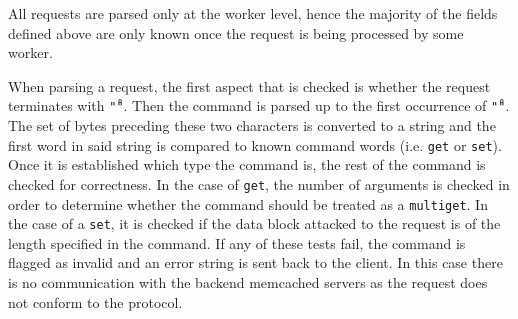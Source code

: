 \documentclass[11pt,a4paper]{article}
\begin{document}
All requests are parsed only at the worker level, hence the majority of the fields defined above are only known once the request is being processed by some worker.

When parsing a request, the first aspect that is checked is whether the request terminates with \texttt{"\r\n"}. Then the command is parsed up to the first occurrence of \texttt{"\r\n"}. The set of bytes preceding these two characters is converted to a string and the first word in said string is compared to known command words (i.e. \texttt{get} or \texttt{set}). Once it is established which type the command is, the rest of the command is checked for correctness. In the case of \texttt{get}, the number of arguments is checked in order to determine whether the command should be treated as a \texttt{multiget}. In the case of a \texttt{set}, it is checked if the data block attacked to the request is of the length specified in the command. If any of these tests fail, the command is flagged as invalid and an error string is sent back to the client. In this case there is no communication with the backend memcached servers as the request does not conform to the protocol.
\end{document}
